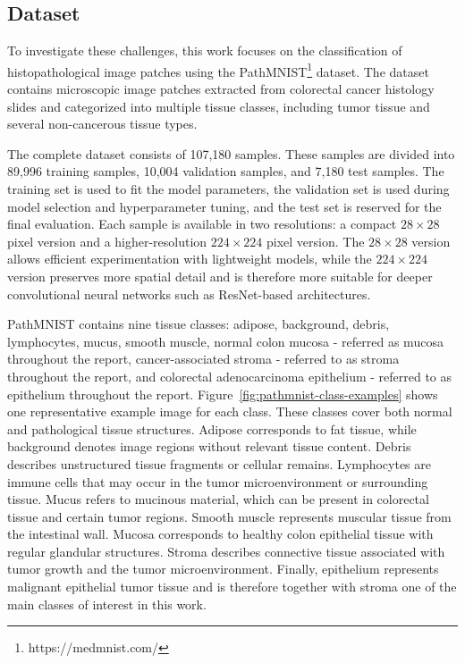 \subsection{Dataset}
To investigate these challenges, this work focuses on the classification of
histopathological image patches using the
PathMNIST\footnote{https://medmnist.com/} dataset. The dataset contains
microscopic image patches extracted from colorectal cancer histology slides and
categorized into multiple tissue classes, including tumor tissue and several
non-cancerous tissue types.

The complete dataset consists of 107,180 samples. These samples are divided into
89,996 training samples, 10,004 validation samples, and 7,180 test samples. The
training set is used to fit the model parameters, the validation set is used
during model selection and hyperparameter tuning, and the test set is reserved
for the final evaluation. Each sample is available in two resolutions: a compact
$28 \times 28$ pixel version and a higher-resolution $224 \times 224$ pixel
version. The $28 \times 28$ version allows efficient experimentation with
lightweight models, while the $224 \times 224$ version preserves more spatial
detail and is therefore more suitable for deeper convolutional neural networks
such as ResNet-based architectures.

PathMNIST contains nine tissue classes: adipose, background, debris,
lymphocytes, mucus, smooth muscle, normal colon mucosa - referred as mucosa
throughout the report, cancer-associated stroma - referred to as stroma
throughout the report, and colorectal adenocarcinoma epithelium - referred to as
epithelium throughout the report.
Figure~\ref{fig:pathmnist-class-examples} shows one representative example image
for each class. These classes cover both normal and pathological tissue
structures. Adipose corresponds to fat tissue, while background denotes image
regions without relevant tissue content. Debris describes unstructured tissue
fragments or cellular remains. Lymphocytes are immune cells that may occur in
the tumor microenvironment or surrounding tissue. Mucus refers to mucinous
material, which can be present in colorectal tissue and certain tumor regions.
Smooth muscle represents muscular tissue from the intestinal wall. Mucosa
corresponds to healthy colon epithelial tissue with regular glandular
structures. Stroma describes connective tissue associated with tumor growth and
the tumor microenvironment. Finally, epithelium represents malignant epithelial
tumor tissue and is therefore together with stroma one of the main classes of
interest in this work.


